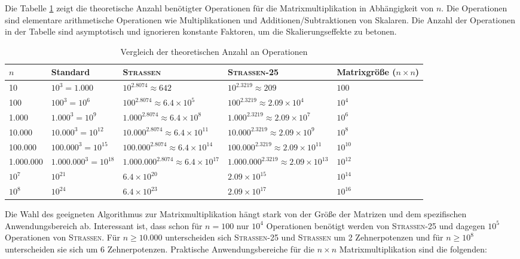 \documentclass{scrartcl}
\numberwithin{equation}{section}
\begin{document}
Die Tabelle \ref{tab:operations-comparison} zeigt die theoretische Anzahl benötigter Operationen für die Matrixmultiplikation in Abhängigkeit von $n$. Die Operationen sind elementare arithmetische Operationen wie Multiplikationen und Additionen/Subtraktionen von Skalaren. Die Anzahl der Operationen in der Tabelle sind asymptotisch und ignorieren konstante Faktoren, um die Skalierungseffekte zu betonen.
\begin{table}[h]
	\centering
	\caption{Vergleich der theoretischen Anzahl an Operationen}
	\label{tab:operations-comparison}
	\renewcommand{\arraystretch}{1.5} %
	\begin{tabular}{m{1.5cm}|m{3cm}|m{3cm}|m{3cm}|m{2cm}}
		\hline
		$n$ & Standard & \textsc{Strassen} & \textsc{Strassen-25} & Matrixgröße ($n \times n$) \\
		\hline\hline
		10 & $10^3 = 1.000$ & $10^{2.8074} \approx 642$ & $10^{2.3219} \approx 209$ & $100$ \\
		\hline
		100 & $100^3 = 10^6$ & $100^{2.8074} \approx 6.4 \times 10^5$ & $100^{2.3219} \approx 2.09 \times 10^4$ & $10^4$ \\
		\hline
		1.000 & $1.000^3 = 10^9$ & $1.000^{2.8074} \approx 6.4 \times 10^8$ & $1.000^{2.3219} \approx 2.09 \times 10^7$ & $10^6$ \\
		\hline
		10.000 & $10.000^3 = 10^{12}$ & $10.000^{2.8074} \approx 6.4 \times 10^{11}$ & $10.000^{2.3219} \approx 2.09 \times 10^{9}$ & $10^8$ \\
		\hline
		100.000 & $100.000^3 = 10^{15}$ & $100.000^{2.8074} \approx 6.4 \times 10^{14}$ & $100.000^{2.3219} \approx 2.09 \times 10^{11}$ & $10^{10}$ \\
		\hline
		1.000.000 & $1.000.000^3 = 10^{18}$ & $1.000.000^{2.8074} \approx 6.4 \times 10^{17}$ & $1.000.000^{2.3219} \approx 2.09 \times 10^{13}$ & $10^{12}$ \\
		\hline
		$10^7$ & $10^{21}$ & $6.4 \times 10^{20}$ & $2.09 \times 10^{15}$ & $10^{14}$ \\
		\hline
		$10^8$ & $10^{24}$ & $6.4 \times 10^{23}$ & $2.09 \times 10^{17}$ & $10^{16}$ \\
		\hline
	\end{tabular}
\end{table}
Die Wahl des geeigneten Algorithmus zur Matrixmultiplikation hängt stark von der Größe der Matrizen und dem spezifischen Anwendungsbereich ab. Interessant ist, dass schon für $n = 100$ nur $10^{4}$ Operationen benötigt werden von \textsc{Strassen-25} und dagegen $10^{5}$ Operationen von \textsc{Strassen}. Für $n \geq 10.000$ unterscheiden sich \textsc{Strassen-25} und \textsc{Strassen} um 2 Zehnerpotenzen und für $n \geq 10^8$ unterscheiden sie sich um 6 Zehnerpotenzen. Praktische Anwendungsbereiche für die $n \times n$ Matrixmultiplikation sind die folgenden:
\end{document}
